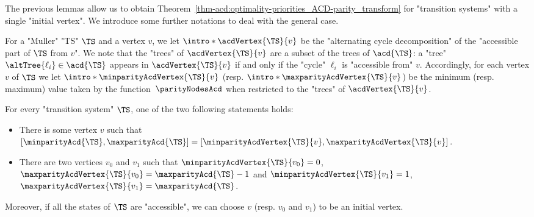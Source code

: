 \documentclass[10pt,a4paper]{amsart}
\begin{document}
The previous lemmas allow us to obtain Theorem~\ref{thm-acd:optimality-priorities_ACD-parity_transform} for "transition systems" with a single "initial vertex". We introduce some further notations to deal with the general case.

\AP For a "Muller" "TS" $\TS$ and a vertex $v$, we let $\intro*\acdVertex{\TS}{v}$ be the "alternating cycle decomposition" of the "accessible part of $\TS$ from $v$". We note that the "trees" of $\acdVertex{\TS}{v}$ are a subset of the trees of $\acd{\TS}$: a "tree" $\altTree{\ell_i}\in \acd{\TS}$ appears in $\acdVertex{\TS}{v}$ if and only if the "cycle" $\ell_i$ is "accessible from" $v$.
\AP Accordingly, for each vertex $v$ of $\TS$ we let $\intro*\minparityAcdVertex{\TS}{v}$ (resp. $\intro*\maxparityAcdVertex{\TS}{v}$) be the minimum (resp. maximum) value taken by the function~$\parityNodesAcd$ when restricted to the "trees" of $\acdVertex{\TS}{v}$.

\begin{remark}\label{rmk-acd:priorities-accessible-from-vertex}
	For every "transition system" $\TS$, one of the two following statements holds:
	\begin{itemize}
		\item There is some vertex $v$ such that $[\minparityAcd{\TS}, \maxparityAcd{\TS}] = [\minparityAcdVertex{\TS}{v}, \maxparityAcdVertex{\TS}{v}]$.
		\item There are two vertices $v_0$ and $v_1$ such that $\minparityAcdVertex{\TS}{v_0}=0$, $\maxparityAcdVertex{\TS}{v_0} = \maxparityAcd{\TS}-1$ and $\minparityAcdVertex{\TS}{v_1}=1$, $\maxparityAcdVertex{\TS}{v_1} = \maxparityAcd{\TS}$.
	\end{itemize}
Moreover, if all the states of $\TS$ are "accessible", we can choose $v$ (resp. $v_0$ and $v_1$) to be an initial vertex.
\end{remark} 
\end{document}
